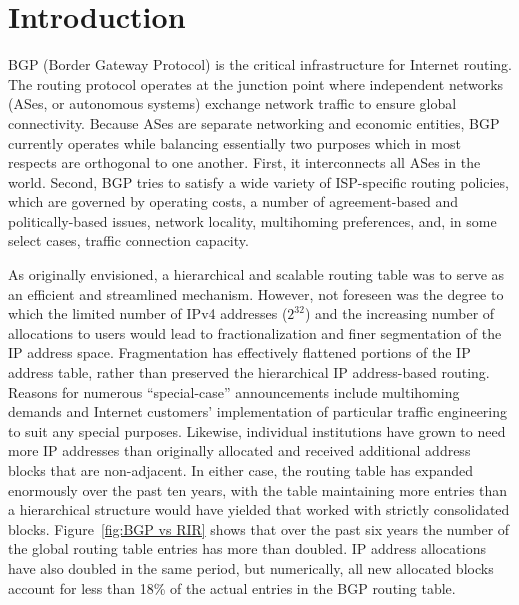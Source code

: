 \section{Introduction}

BGP (Border Gateway Protocol) \cite{Rekhter:1995:RFC1771-BGP} is the critical
infrastructure for Internet routing. The routing protocol operates at the
junction point where independent networks (ASes, or autonomous systems)
exchange network traffic to ensure global connectivity. Because ASes are
separate networking and economic entities, BGP currently operates while
balancing essentially two purposes which in most respects are orthogonal to one
another. First, it interconnects all ASes in the world. Second, BGP tries to
satisfy a wide variety of ISP-specific routing policies, which are governed by
operating costs, a number of agreement-based and politically-based issues,
network locality, multihoming preferences, and, in some select cases, traffic
connection capacity.


As originally envisioned, a hierarchical and scalable routing table was to
serve as an efficient and streamlined mechanism. However, not foreseen was the
degree to which the limited number of IPv4 addresses ($2^{32}$) and the
increasing number of allocations to users would lead to fractionalization and
finer segmentation of the IP address space. Fragmentation has effectively
flattened portions of the IP address table, rather than preserved the
hierarchical IP address-based routing. Reasons for numerous ``special-case''
announcements include multihoming demands and Internet customers'
implementation of particular traffic engineering to suit any special purposes.
Likewise, individual institutions have grown to need more IP addresses than
originally allocated and received additional address blocks that are
non-adjacent. In either case, the routing table has expanded enormously over
the past ten years, with the table maintaining more entries than a hierarchical
structure would have yielded that worked with strictly consolidated blocks.
Figure~\ref{fig:BGP vs RIR} shows that over the past six years the number of
the global routing table entries has more than doubled. IP address allocations
have also doubled in the same period, but numerically, all new allocated blocks
account for less than 18\% of the actual entries in the BGP routing table.

